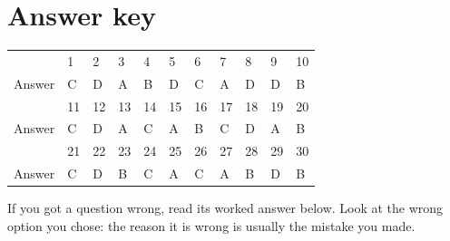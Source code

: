 
\section*{Answer key}
\begin{table}
  \centering\renewcommand{}
  \begin{tabular}{@{}l*{10}{C{9mm}}@{}}
    \toprule
     & 1 & 2 & 3 & 4 & 5 & 6 & 7 & 8 & 9 & 10\\
    Answer & C & D & A & B & D & C & A & D & D & B\\
    \midrule
     & 11 & 12 & 13 & 14 & 15 & 16 & 17 & 18 & 19 & 20\\
    Answer & C & D & A & C & A & B & C & D & A & B\\
    \midrule
     & 21 & 22 & 23 & 24 & 25 & 26 & 27 & 28 & 29 & 30\\
    Answer & C & D & B & C & A & C & A & B & D & B\\
    \bottomrule
  \end{tabular}
\end{table}

If you got a question wrong, read its worked answer below. Look at the wrong option you chose:
the reason it is wrong is usually the mistake you made.

